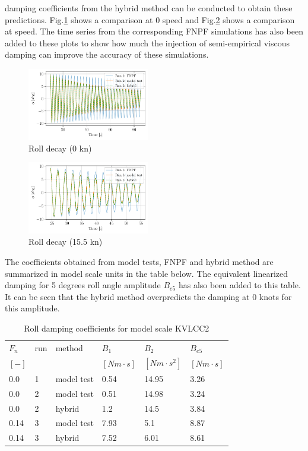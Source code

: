damping coefficients from the hybrid method can be conducted to obtain
these predictions. Fig.\ref{fig:hybrid_0_time} shows a
comparison at 0 speed and Fig.\ref{fig:hybrid_speed_time} shows
a comparison at speed. The time series from the corresponding FNPF
simulations has also been added to these plots to show how much the
injection of semi-empirical viscous damping can improve the accuracy of
these simulations.
\begin{figure}[H]
\begin{center}\includegraphics[width = 0.475\textwidth]{figures/hybrid_0_time.pdf}\end{center}
\vspace{-1cm}
\caption{Roll decay (0 kn)}
\label{fig:hybrid_0_time}
\end{figure}
\begin{figure}[H]
\begin{center}\includegraphics[width = 0.475\textwidth]{figures/hybrid_speed_time.pdf}\end{center}
\vspace{-1cm}
\caption{Roll decay (15.5 kn)}
\label{fig:hybrid_speed_time}
\end{figure}
The coefficients obtained from model tests, FNPF and hybrid method are
summarized in model scale units in the table below. The equivalent
linearized damping for 5 degrees roll angle amplitude $B_{e5}$ has
also been added to this table. It can be seen that the hybrid method
overpredicts the damping at 0 knots for this amplitude.
\begin{table}[H]
\scriptsize
\center
\caption{Roll damping coefficients for model scale KVLCC2}
\label{tab:results}
\begin{tabular}{|l|l|l|l|l|l|}
\hline\addlinespace
$F_n$ & run & method & $B_1$ & $B_2$ & $B_{e5}$\\
$[-]$ &  &  & $[Nm \cdot s]$ & $[Nm \cdot s^2]$ & $[Nm \cdot s]$\\
\hline0.0 & 1 & model test & 0.54 & 14.95 & 3.26\\
0.0 & 2 & model test & 0.51 & 14.98 & 3.24\\
0.0 & 2 & hybrid & 1.2 & 14.5 & 3.84\\
0.14 & 3 & model test & 7.93 & 5.1 & 8.87\\
0.14 & 3 & hybrid & 7.52 & 6.01 & 8.61\\
\hline
\end{tabular}
\end{table}
